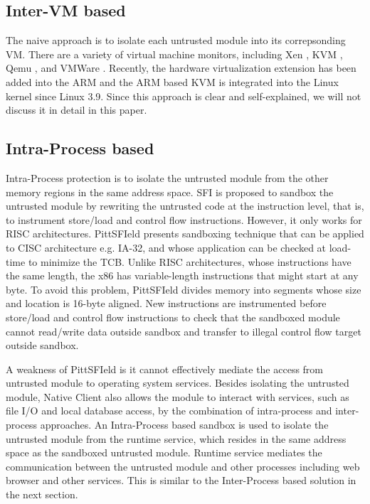 \subsection{Inter-VM based}
\label{sec:problem2:inter-vm}

The naive approach is to isolate each untrusted module into its correpsonding
VM. There are a variety of virtual machine monitors, including Xen \cite{xen}, KVM \cite{kvm}, Qemu
\cite{qemu},
and VMWare \cite{vmware}.  Recently, the hardware virtualization extension has been added into
the ARM and the ARM based KVM \cite{KVM/ARM} is integrated into the Linux kernel
since Linux 3.9. Since this approach is clear and self-explained, we will not
discuss it in detail in this paper.

\subsection{Intra-Process based}
\label{sec:problem2:intra-process}

Intra-Process protection is to isolate the untrusted module from the other
memory regions in the same address space. SFI \cite{SFI} is proposed to sandbox
the untrusted module by rewriting the untrusted code at the instruction level,
that is, to instrument store/load and control flow instructions. However, it
only works for RISC architectures. PittSFIeld \cite{PittSFIeld} presents
sandboxing technique that can be applied to CISC architecture e.g. IA-32, and
whose application can be checked at load-time to minimize the TCB.  Unlike RISC
architectures, whose instructions have the same length, the x86 has
variable-length instructions that might start at any byte. To avoid this
problem, PittSFIeld divides memory into segments whose size and location is
16-byte aligned.  New instructions are instrumented before store/load and
control flow instructions to check that the sandboxed module cannot read/write
data outside sandbox and transfer to illegal control flow target outside
sandbox.

A weakness of PittSFIeld is it cannot effectively mediate the access from
untrusted module to operating system services. Besides isolating the untrusted
module, Native Client \cite{NaCl} also allows the module to interact
with services, such as file I/O and local database access, by the combination of
intra-process and inter-process approaches.  An Intra-Process based sandbox is
used to isolate the untrusted module from the runtime service, which resides in
the same address space as the sandboxed untrusted module. Runtime service
mediates the communication between the untrusted module and other processes
including web browser and other services. This is similar to the Inter-Process
based solution in the next section.

